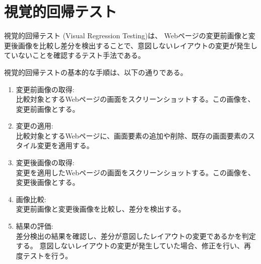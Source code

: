 \section{視覚的回帰テスト}\label{sec:vrt}
視覚的回帰テスト (Visual Regression Testing)\cite{VisualRegressionTesting}は、
Webページの変更前画像と変更後画像を比較し差分を検出することで、意図しないレイアウトの変更が発生していないことを確認するテスト手法である。\\
\par
視覚的回帰テストの基本的な手順は、以下の通りである。
\begin{enumerate}
      \setlength{\itemsep}{0pt}
            \setlength{\parsep}{0pt}
      \item 変更前画像の取得:\\
            比較対象とするWebページの画面をスクリーンショットする。この画像を、変更前画像とする。
      \item 変更の適用:\\
            比較対象とするWebページに、画面要素の追加や削除、既存の画面要素のスタイル変更を適用する。
      \item 変更後画像の取得:\\
            変更を適用したWebページの画面をスクリーンショットする。この画像を、変更後画像とする。
      \item 画像比較:\\
            変更前画像と変更後画像を比較し、差分を検出する。
      \item 結果の評価:\\
            差分検出の結果を確認し、差分が意図したレイアウトの変更であるかを判定する。
            意図しないレイアウトの変更が発生していた場合、修正を行い、再度テストを行う。
\end{enumerate}

